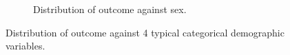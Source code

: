 \begin{figure}[!htp]
\begin{subfigure}[b]{0.49\linewidth}
    \caption[]
    {Distribution of outcome against sex.}
    \label{fig:outcome_sex_corr}
\end{subfigure}
\caption[]
{Distribution of outcome against 4 typical categorical demographic variables.}
\label{fig:outcome_corr}
\end{figure}
